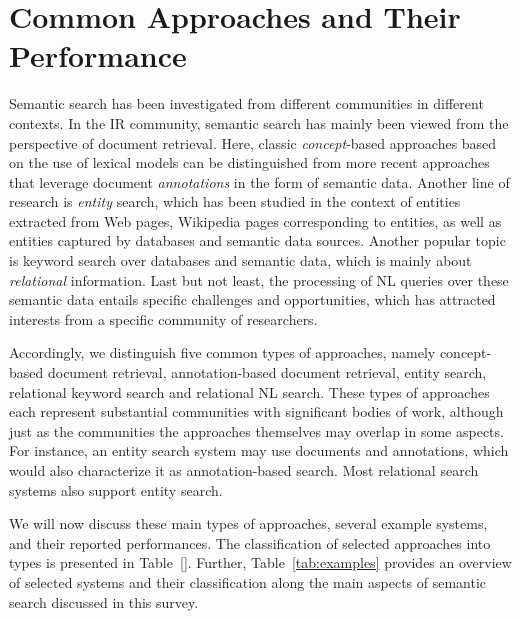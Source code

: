 \section{Common Approaches and Their Performance}\label{sec:approaches}	
Semantic search has been investigated from different communities in different contexts. In the IR community, semantic search has mainly been viewed from the perspective of document retrieval. Here, classic \emph{concept}-based approaches based on the use of lexical models can be distinguished from more recent approaches that leverage document \emph{annotations} in the form of semantic data. Another line of research is \emph{entity} search, which has been studied in the context of entities extracted from Web pages, Wikipedia pages corresponding to entities, as well as entities captured by databases and semantic data sources. Another popular topic is keyword search over databases and semantic data, which is mainly about \emph{relational} information. Last but not least, the processing of NL queries over these semantic data entails specific challenges and opportunities, which has attracted interests from a specific community of researchers. 

Accordingly, we distinguish five common types of approaches, namely concept-based document retrieval, annotation-based document retrieval, entity search, relational keyword search and relational NL search. These types of approaches each represent substantial communities with significant bodies of work, although just as the communities the approaches themselves may overlap in some aspects. For instance, an entity search system may use documents and annotations, which would also characterize it as annotation-based search. Most relational search systems also support entity search.  

We will now discuss these main types of approaches, several example systems, and their reported performances. The classification of selected approaches into types is presented in Table~\ref{}. Further, Table~\ref{tab:examples} provides an overview of selected systems and their classification along the main aspects of semantic search discussed in this survey. 



